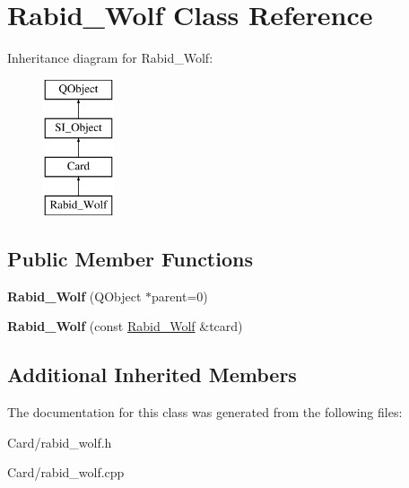 \hypertarget{class_rabid___wolf}{}\section{Rabid\+\_\+\+Wolf Class Reference}
\label{class_rabid___wolf}
Inheritance diagram for Rabid\+\_\+\+Wolf\+:\begin{figure}[H]
\begin{center}
\leavevmode
\includegraphics[height=4.000000cm]{class_rabid___wolf}
\end{center}
\end{figure}
\subsection*{Public Member Functions}
\begin{DoxyCompactItemize}
\item 
\mbox{\label{class_rabid___wolf_a28e219c57f52f31a9120cd868814f037}} 
{\bfseries Rabid\+\_\+\+Wolf} (Q\+Object $\ast$parent=0)
\item 
\mbox{\label{class_rabid___wolf_af4f455c4b0b49f446ad95b10c0bacd57}} 
{\bfseries Rabid\+\_\+\+Wolf} (const \hyperlink{class_rabid___wolf}{Rabid\+\_\+\+Wolf} \&tcard)
\end{DoxyCompactItemize}
\subsection*{Additional Inherited Members}


The documentation for this class was generated from the following files\+:\begin{DoxyCompactItemize}
\item 
Card/rabid\+\_\+wolf.\+h\item 
Card/rabid\+\_\+wolf.\+cpp\end{DoxyCompactItemize}
